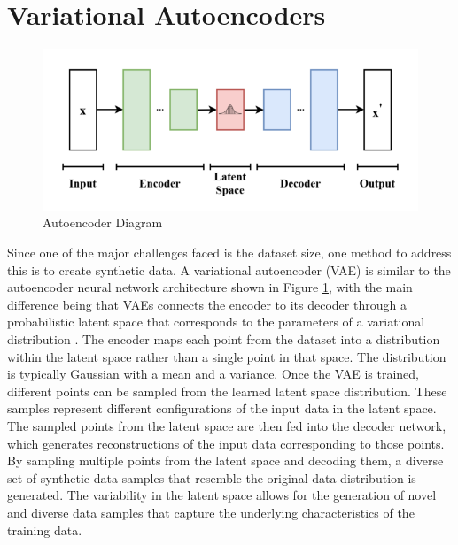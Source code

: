 \section{Variational Autoencoders}
\begin{figure}[h!]
  \centering
    \includegraphics[width=1.0\textwidth]{figures/autoencoder_architecture.png}
    \caption{Autoencoder Diagram}
    \label{autoencoder_diagram}
\end{figure}
Since one of the major challenges faced is the dataset size, one method to address this is to create synthetic data. 
A variational autoencoder (VAE) is similar to the autoencoder neural network architecture shown in Figure \ref{autoencoder_diagram}, with the main difference being that VAEs connects the encoder to its decoder through a probabilistic latent space that corresponds to the parameters of a variational distribution \cite{PinheiroCinelli2021}. The encoder maps each point from the dataset into a distribution within the latent space rather than a single point in that space. The distribution is typically Gaussian with a mean and a variance. Once the VAE is trained, different points can be sampled from the learned latent space distribution. These samples represent different configurations of the input data in the latent space. The sampled points from the latent space are then fed into the decoder network, which generates reconstructions of the input data corresponding to those points. By sampling multiple points from the latent space and decoding them, a diverse set of synthetic data samples that resemble the original data distribution is generated. The variability in the latent space allows for the generation of novel and diverse data samples that capture the underlying characteristics of the training data.
